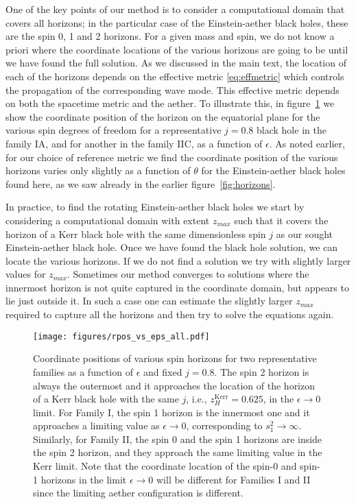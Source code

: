 \documentclass[12pt]{article}
\numberwithin{equation}{section}
\begin{document}
One of the key points of our method is to consider a computational domain that covers all horizons; in the particular case of the Einstein-aether black holes, these are the spin 0, 1 and 2 horizons. For a given mass and spin, we do not know a priori where the coordinate locations of the various horizons are going to be until we have found the full solution. As we discussed in the main text, the location of each of the horizons depends on the effective metric \eqref{eq:effmetric} which controls the propagation of the corresponding wave mode. This effective metric depends on both the spacetime metric and the aether.
To illustrate this, in figure~\ref{fig:horizonstwo} we show the coordinate position of the horizon on the equatorial plane for the various spin degrees of freedom for a representative $j = 0.8$ black hole in the family IA, and for another in the family IIC, as a function of $\epsilon$. As noted earlier, for our choice of reference metric we find the coordinate position of the various horizons varies only slightly as a function of $\theta$ for the Einstein-aether black holes found here, as we saw already in the earlier figure~\ref{fig:horizons}.



 In practice, to find the rotating Einstein-aether black holes we start by considering a computational domain with extent $z_{max}$ such that it covers the horizon of a Kerr black hole with the same dimensionless spin $j$ as our sought Einstein-aether black hole. Once we have found the black hole solution, we can locate the various horizons. If we do not find a solution we try with slightly larger values for $z_{max}$. Sometimes our method converges to solutions where the innermost horizon is not quite captured in the coordinate domain, but appears to lie just outside it. In such a case one can estimate the slightly larger $z_{max}$ required to capture all the horizons and then try to solve the equations again.


\begin{figure}
\centerline{
  \texttt{[image: figures/rpos\_vs\_eps\_all.pdf]}
  }
  \caption{\label{fig:horizonstwo}
  Coordinate positions of various spin horizons for two representative families as a function of $\epsilon$ and fixed $j=0.8$. The spin 2 horizon is always the outermost and it approaches the location of the horizon of a Kerr black hole with the same $j$, i.e., $z_H^\textrm{Kerr}=0.625$, in the $\epsilon\to 0$ limit. For Family I, the spin 1 horizon is the innermost one and it approaches a limiting value as $\epsilon\to 0$, corresponding to $s_1^2\to\infty$. Similarly, for Family II, the spin 0 and the spin 1 horizons are inside the spin 2 horizon, and they approach the same limiting value in the Kerr limit. Note that the coordinate location of the spin-0 and spin-1 horizons in the limit $\epsilon \to 0$  will be different for Families I and II since the limiting aether configuration is different. 
  }
\end{figure}
\end{document}
